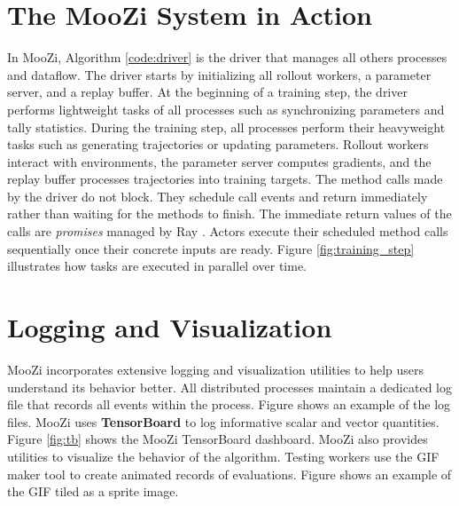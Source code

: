 \section{The MooZi System in Action}
In MooZi, Algorithm \ref{code:driver} is the driver that manages all others processes and dataflow.
The driver starts by initializing all rollout workers, a parameter server, and a replay buffer.
At the beginning of a training step, the driver performs lightweight tasks of all processes such as synchronizing parameters and tally statistics.
During the training step, all processes perform their heavyweight tasks such as generating trajectories or updating parameters.
Rollout workers interact with environments, the parameter server computes gradients, and the replay buffer processes trajectories into training targets.
The method calls made by the driver do not block.
They schedule call events and return immediately rather than waiting for the methods to finish.
The immediate return values of the calls are \textit{promises} managed by Ray \cite{FuturesPromises__2022}.
Actors execute their scheduled method calls sequentially once their concrete inputs are ready.
Figure \ref{fig:training_step} illustrates how tasks are executed in parallel over time.

\section{Logging and Visualization} \label{sec:logging}
MooZi incorporates extensive logging and visualization utilities to help users understand its behavior better.
All distributed processes maintain a dedicated log file that records all events within the process.
Figure  shows an example of the log files.
MooZi uses \textbf{TensorBoard} \cite{TensorFlowLargescaleMachine_Abadi.Agarwal.ea_2015} to log informative scalar and vector quantities.
Figure \ref{fig:tb} shows the MooZi TensorBoard dashboard.
MooZi also provides utilities to visualize the behavior of the algorithm.
Testing workers use the GIF maker tool to create animated records of evaluations.
Figure  shows an example of the GIF tiled as a sprite image.
